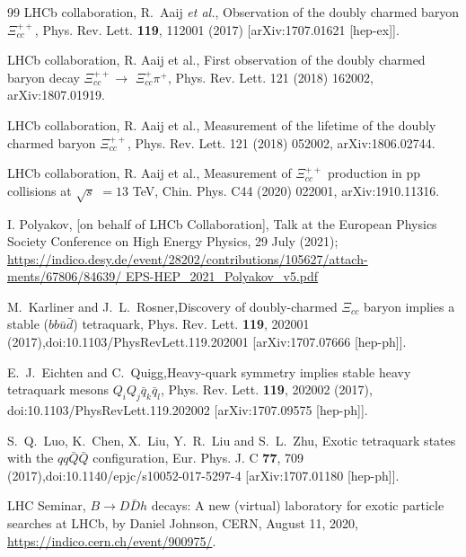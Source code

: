 \documentclass[prd,twocolumn,floatfix,nofootinbib]{revtex4}
\begin{document}
\begin{thebibliography}{99}
 LHCb collaboration, R.~Aaij \textit{et al.},
Observation of the doubly charmed baryon $\Xi _{cc}^{++}$, Phys. Rev. Lett.
\textbf{119}, 112001 (2017) [arXiv:1707.01621 [hep-ex]].

 LHCb collaboration, R. Aaij et al., First observation
of the doubly charmed baryon decay $\Xi _{cc}^{++}\rightarrow $ $\Xi
_{cc}^{+}\pi ^{+}$, Phys. Rev. Lett. 121 (2018) 162002, arXiv:1807.01919.

 LHCb collaboration, R. Aaij et al., Measurement of
the lifetime of the doubly charmed baryon $\Xi _{cc}^{++}$, Phys. Rev. Lett.
121 (2018) 052002, arXiv:1806.02744.

 LHCb collaboration, R. Aaij et al., Measurement of $%
\Xi _{cc}^{++}$ production in pp collisions at $\sqrt{s}$ $=13$ TeV, Chin.
Phys. C44 (2020) 022001, arXiv:1910.11316.

 I. Polyakov, [on behalf of LHCb Collaboration], Talk
at the European Physics Society Conference on High Energy Physics, 29 July
(2021); \href{https://indico.desy.de/event/28202/contributions/105627/attachments/67806/84639/ EPS-HEP\_2021\_Polyakov\_v5.pdf}%
{%
https://indico.desy.de/event/28202/contributions/105627/attach-ments/67806/84639/ EPS-HEP\_2021\_Polyakov\_v5.pdf%
}

 M.~Karliner and J.~L.~Rosner,Discovery of
doubly-charmed $\Xi_{cc}$ baryon implies a stable ($b b \bar{u} \bar{d}$)
tetraquark, Phys. Rev. Lett. \textbf{119}, 202001
(2017),doi:10.1103/PhysRevLett.119.202001 [arXiv:1707.07666 [hep-ph]].

 E.~J.~Eichten and C.~Quigg,Heavy-quark symmetry
implies stable heavy tetraquark mesons $Q_iQ_j \bar q_k \bar q_l$, Phys.
Rev. Lett. \textbf{119}, 202002 (2017), doi:10.1103/PhysRevLett.119.202002
[arXiv:1707.09575 [hep-ph]].

 S.~Q.~Luo, K.~Chen, X.~Liu, Y.~R.~Liu and S.~L.~Zhu,
Exotic tetraquark states with the $qq\bar{Q}\bar{Q}$ configuration, Eur.
Phys. J. C \textbf{77}, 709 (2017),doi:10.1140/epjc/s10052-017-5297-4
[arXiv:1707.01180 [hep-ph]].

 LHC Seminar, $B\to D\bar{D}h$ decays: A new (virtual)
laboratory for exotic particle searches at LHCb, by Daniel Johnson, CERN,
August 11, 2020, \href{https://indico.cern.ch/event/900975/}{%
https://indico.cern.ch/event/900975/}.


\end{thebibliography}
\end{document}
